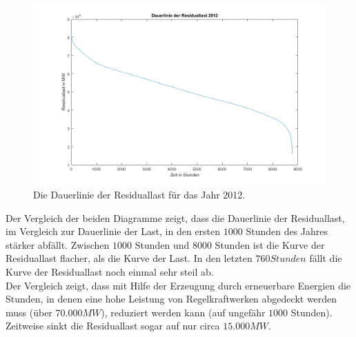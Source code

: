 \documentclass[a4paper,12pt]{article}
\begin{document}
	\begin{figure}[H]
		\centering
		\includegraphics[width=12cm]{img/results/DauerlinieResiduallast2012}
		\caption{Die Dauerlinie der Residuallast für das Jahr 2012.}
	\end{figure}
	Der Vergleich der beiden Diagramme zeigt, dass die Dauerlinie der Residuallast, im Vergleich zur Dauerlinie der Last, in den ersten $1000$ Stunden des Jahres stärker abfällt. Zwischen $1000$ Stunden und $8000$ Stunden ist die Kurve der Residuallast flacher, als die Kurve der Last. In den letzten $760 Stunden$ fällt die Kurve der Residuallast noch einmal sehr steil ab.\\
	Der Vergleich zeigt, dass mit Hilfe der Erzeugung durch erneuerbare Energien die Stunden, in denen eine hohe Leistung von Regelkraftwerken abgedeckt werden muss (über $70.000 MW$), reduziert werden kann (auf ungefähr $1000$ Stunden). Zeitweise sinkt die Residuallast sogar auf nur circa $15.000MW$.
\end{document}
